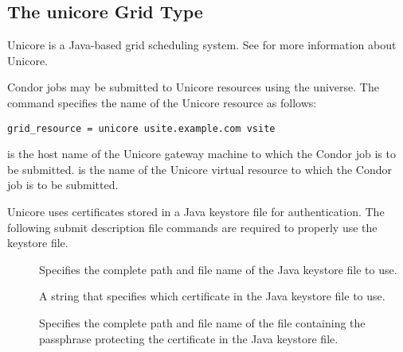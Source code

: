 
\subsection{\label{sec:Unicore}The unicore Grid Type }

Unicore is a Java-based grid scheduling system.
See  for more information about Unicore.

Condor jobs may be submitted to
Unicore resources using the  universe.
The  command specifies the name of the
Unicore resource as follows:
\begin{verbatim}
grid_resource = unicore usite.example.com vsite
\end{verbatim}
 is the host name of the Unicore gateway
machine to which the Condor job is to be submitted.
 is the name of the Unicore virtual resource to which
the Condor job is to be submitted.

Unicore uses certificates stored in a Java keystore file for
authentication. 
The following submit description file commands
are required to properly use the keystore file.

\begin{description}
\item[] 
  Specifies the complete path and file name of the Java keystore file to use. 
\item[] 
  A string that specifies which certificate in the
  Java keystore file to use. 
\item[]
  Specifies the complete path and file name of the 
  file containing the passphrase protecting the certificate in the  
  Java keystore file.
\end{description}
